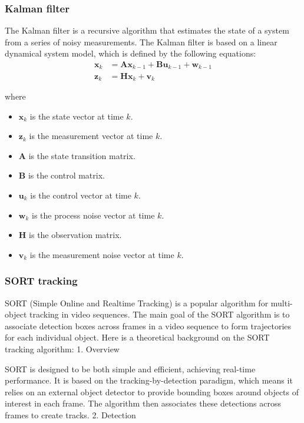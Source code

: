 \subsubsection{Kalman filter} \label{subsubsec:kalman_filter}
The Kalman filter is a recursive algorithm that estimates the state of a system from a series of noisy measurements. The Kalman filter is based on a linear dynamical system model, which is defined by the following equations:
\begin{equation}
    \begin{aligned}
        \mathbf{x}_k & = \mathbf{Ax}_{k - 1} + \mathbf{Bu}_{k - 1} + \mathbf{w}_{k - 1} \\
        \mathbf{z}_k & = \mathbf{Hx}_k + \mathbf{v}_k
    \end{aligned}
    \label{eq:kalman_filter}
\end{equation}

where

\begin{itemize}
    \item $\mathbf{x}_k$ is the state vector at time $k$.
    \item $\mathbf{z}_k$ is the measurement vector at time $k$.
    \item $\mathbf{A}$ is the state transition matrix.
    \item $\mathbf{B}$ is the control matrix.
    \item $\mathbf{u}_k$ is the control vector at time $k$.
    \item $\mathbf{w}_k$ is the process noise vector at time $k$.
    \item $\mathbf{H}$ is the observation matrix.
    \item $\mathbf{v}_k$ is the measurement noise vector at time $k$.
\end{itemize}


\subsubsection{SORT tracking} \label{subsubsec:sort_tracking}
SORT (Simple Online and Realtime Tracking) is a popular algorithm for multi-object tracking in video sequences. The main goal of the SORT algorithm is to associate detection boxes across frames in a video sequence to form trajectories for each individual object. Here is a theoretical background on the SORT tracking algorithm:
1. Overview

SORT is designed to be both simple and efficient, achieving real-time performance. It is based on the tracking-by-detection paradigm, which means it relies on an external object detector to provide bounding boxes around objects of interest in each frame. The algorithm then associates these detections across frames to create tracks.
2. Detection

